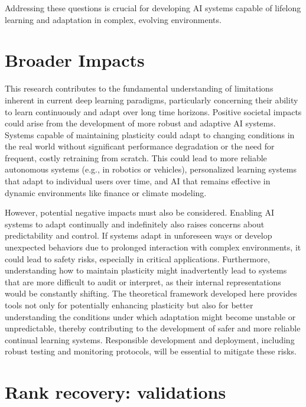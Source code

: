 \documentclass{article}
\begin{document}
Addressing these questions is crucial for developing AI systems capable of lifelong learning and adaptation in complex, evolving environments.

\section{Broader Impacts}
This research contributes to the fundamental understanding of limitations inherent in current deep learning paradigms, particularly concerning their ability to learn continuously and adapt over long time horizons. Positive societal impacts could arise from the development of more robust and adaptive AI systems. Systems capable of maintaining plasticity could adapt to changing conditions in the real world without significant performance degradation or the need for frequent, costly retraining from scratch. This could lead to more reliable autonomous systems (e.g., in robotics or vehicles), personalized learning systems that adapt to individual users over time, and AI that remains effective in dynamic environments like finance or climate modeling.

However, potential negative impacts must also be considered. Enabling AI systems to adapt continually and indefinitely also raises concerns about predictability and control. If systems adapt in unforeseen ways or develop unexpected behaviors due to prolonged interaction with complex environments, it could lead to safety risks, especially in critical applications. Furthermore, understanding how to maintain plasticity might inadvertently lead to systems that are more difficult to audit or interpret, as their internal representations would be constantly shifting. The theoretical framework developed here provides tools not only for potentially enhancing plasticity but also for better understanding the conditions under which adaptation might become unstable or unpredictable, thereby contributing to the development of safer and more reliable continual learning systems. Responsible development and deployment, including robust testing and monitoring protocols, will be essential to mitigate these risks.



\appendix

\section{Rank recovery: validations }
\end{document}
